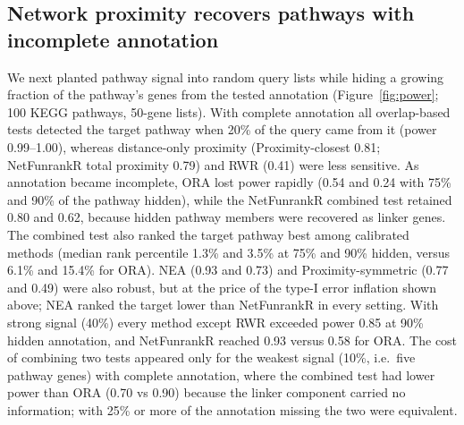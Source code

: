 \subsection{Network proximity recovers pathways with incomplete annotation}\label{res:power}
We next planted pathway signal into random query lists while hiding a growing fraction of the pathway's genes from the tested annotation (Figure~\ref{fig:power}; 100 KEGG pathways, 50-gene lists). With complete annotation all overlap-based tests detected the target pathway when 20\% of the query came from it (power 0.99--1.00), whereas distance-only proximity (Proximity-closest 0.81; NetFunrankR total proximity 0.79) and RWR (0.41) were less sensitive. As annotation became incomplete, ORA lost power rapidly (0.54 and 0.24 with 75\% and 90\% of the pathway hidden), while the NetFunrankR combined test retained 0.80 and 0.62, because hidden pathway members were recovered as linker genes. The combined test also ranked the target pathway best among calibrated methods (median rank percentile 1.3\% and 3.5\% at 75\% and 90\% hidden, versus 6.1\% and 15.4\% for ORA). NEA (0.93 and 0.73) and Proximity-symmetric (0.77 and 0.49) were also robust, but at the price of the type-I error inflation shown above; NEA ranked the target lower than NetFunrankR in every setting. With strong signal (40\%) every method except RWR exceeded power 0.85 at 90\% hidden annotation, and NetFunrankR reached 0.93 versus 0.58 for ORA. The cost of combining two tests appeared only for the weakest signal (10\%, i.e.\ five pathway genes) with complete annotation, where the combined test had lower power than ORA (0.70 vs 0.90) because the linker component carried no information; with 25\% or more of the annotation missing the two were equivalent.

